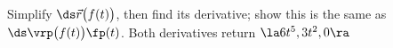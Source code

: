 {Simplify $\ds \vec r\big(f(t)\big)$, then find its derivative; show this is the same as $\ds \vrp\big(f(t)\big)\fp(t)$.
}
{
Both derivatives return $\la 6t^5,3t^2,0\ra$
}

